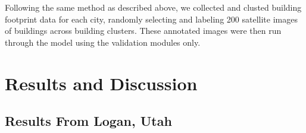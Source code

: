 \documentclass[conference,]{IEEEtran}
\begin{document}
\begin{table}

\caption{\label{tbl-val-cities}}


\end{table}%

Following the same method as described above, we collected and clusted
building footprint data for each city, randomly selecting and labeling
200 satellite images of buildings across building clusters. These
annotated images were then run through the model using the validation
modules only.

\section{Results and Discussion}\label{results-and-discussion}

\subsection{Results From Logan, Utah}\label{results-from-logan-utah}
\end{document}
